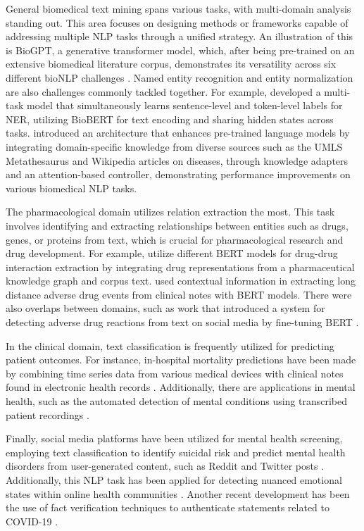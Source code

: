\documentclass[fleqn,10pt]{olplainarticle}
\begin{document}
General biomedical text mining spans various tasks, with multi-domain analysis standing out. This area focuses on designing methods or frameworks capable of addressing multiple NLP tasks through a unified strategy. An illustration of this is BioGPT, a generative transformer model, which, after being pre-trained on an extensive biomedical literature corpus, demonstrates its versatility across six different bioNLP challenges \citep{luo2022biogpt}. Named entity recognition and entity normalization are also challenges commonly tackled together. For example, \citep{tong2021multi} developed a multi-task model that simultaneously learns sentence-level and token-level labels for NER, utilizing BioBERT for text encoding and sharing hidden states across tasks. \cite{lu2021parameter} introduced an architecture that enhances pre-trained language models by integrating domain-specific knowledge from diverse sources such as the UMLS Metathesaurus and Wikipedia articles on diseases, through knowledge adapters and an attention-based controller, demonstrating performance improvements on various biomedical NLP tasks.

The pharmacological domain utilizes relation extraction the most. This task involves identifying and extracting relationships between entities such as drugs, genes, or proteins from text, which is crucial for pharmacological research and drug development. For example, \cite{asada2023integrating} utilize different BERT models for drug-drug interaction extraction by integrating drug representations from a pharmaceutical knowledge graph and corpus text. \cite{guan2019leveraging} used contextual information in extracting long distance adverse drug events from clinical notes with BERT models. There were also overlaps between domains, such as work that introduced a system for detecting adverse drug reactions from text on social media by fine-tuning BERT \citep{hussain2021pharmacovigilance}.

In the clinical domain, text classification is frequently utilized for predicting patient outcomes. For instance, in-hospital mortality predictions have been made by combining time series data from various medical devices with clinical notes found in electronic health records \citep{zhang2022pm2f2n, deznabi2021predicting}. Additionally, there are applications in mental health, such as the automated detection of mental conditions using transcribed patient recordings \citep{duan2023cda, aich2022towards}.

Finally, social media platforms have been utilized for mental health screening, employing text classification to identify suicidal risk and predict mental health disorders from user-generated content, such as Reddit and Twitter posts \citep{zanwar2023fuse, sawhney2022risk, sawhney2020time}. Additionally, this NLP task has been applied for detecting nuanced emotional states within online health communities \citep{sosea2020canceremo}. Another recent development has been the use of fact verification techniques to authenticate statements related to COVID-19 \citep{hossain2020covidlies, liu2020adapting}.
\end{document}
